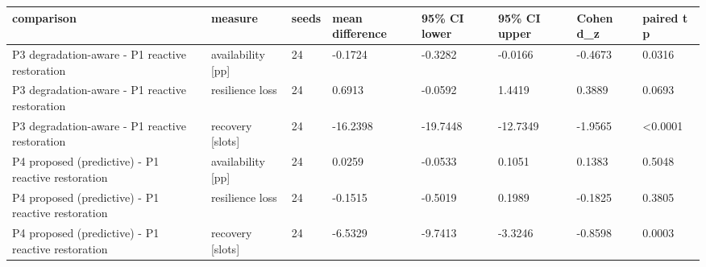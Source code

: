 \begin{tabular}{llllllll}
\toprule
comparison & measure & seeds & mean difference & 95\% CI lower & 95\% CI upper & Cohen d\_z & paired t p \\
\midrule
P3 degradation-aware - P1 reactive restoration & availability [pp] & 24 & -0.1724 & -0.3282 & -0.0166 & -0.4673 & 0.0316 \\
P3 degradation-aware - P1 reactive restoration & resilience loss & 24 & 0.6913 & -0.0592 & 1.4419 & 0.3889 & 0.0693 \\
P3 degradation-aware - P1 reactive restoration & recovery [slots] & 24 & -16.2398 & -19.7448 & -12.7349 & -1.9565 & <0.0001 \\
P4 proposed (predictive) - P1 reactive restoration & availability [pp] & 24 & 0.0259 & -0.0533 & 0.1051 & 0.1383 & 0.5048 \\
P4 proposed (predictive) - P1 reactive restoration & resilience loss & 24 & -0.1515 & -0.5019 & 0.1989 & -0.1825 & 0.3805 \\
P4 proposed (predictive) - P1 reactive restoration & recovery [slots] & 24 & -6.5329 & -9.7413 & -3.3246 & -0.8598 & 0.0003 \\
\bottomrule
\end{tabular}
